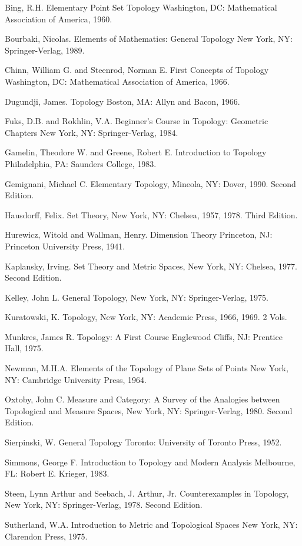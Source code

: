 \documentclass[12pt]{article}
\theoremstyle{plain}
\theoremstyle{definition}
\numberwithin{equation}{section}
\begin{document}
Bing, R.H. Elementary Point Set Topology Washington, DC: Mathematical Association of America, 1960. 

Bourbaki, Nicolas. Elements of Mathematics: General Topology New York, NY: Springer-Verlag, 1989. 

Chinn, William G. and Steenrod, Norman E. First Concepts of Topology Washington, DC: Mathematical Association of America, 1966. 

Dugundji, James. Topology Boston, MA: Allyn and Bacon, 1966. 

Fuks, D.B. and Rokhlin, V.A. Beginner's Course in Topology: Geometric Chapters New York, NY: Springer-Verlag, 1984. 

Gamelin, Theodore W. and Greene, Robert E. Introduction to Topology Philadelphia, PA: Saunders College, 1983. 

Gemignani, Michael C. Elementary Topology, Mineola, NY: Dover, 1990. Second Edition. 

Hausdorff, Felix. Set Theory, New York, NY: Chelsea, 1957, 1978. Third Edition. 

Hurewicz, Witold and Wallman, Henry. Dimension Theory Princeton, NJ: Princeton University Press, 1941. 

Kaplansky, Irving. Set Theory and Metric Spaces, New York, NY: Chelsea, 1977. Second Edition. 

Kelley, John L. General Topology, New York, NY: Springer-Verlag, 1975. 

Kuratowski, K. Topology, New York, NY: Academic Press, 1966, 1969. 2 Vols. 

Munkres, James R. Topology: A First Course Englewood Cliffs, NJ: Prentice Hall, 1975. 

Newman, M.H.A. Elements of the Topology of Plane Sets of Points New York, NY: Cambridge University Press, 1964. 

Oxtoby, John C. Measure and Category: A Survey of the Analogies between Topological and Measure Spaces, New York, NY: Springer-Verlag, 1980. Second Edition. 

Sierpinski, W. General Topology Toronto: University of Toronto Press, 1952. 

Simmons, George F. Introduction to Topology and Modern Analysis Melbourne, FL: Robert E. Krieger, 1983. 

Steen, Lynn Arthur and Seebach, J. Arthur, Jr. Counterexamples in Topology, New York, NY: Springer-Verlag, 1978. Second Edition. 

Sutherland, W.A. Introduction to Metric and Topological Spaces New York, NY: Clarendon Press, 1975. 
\end{document}
